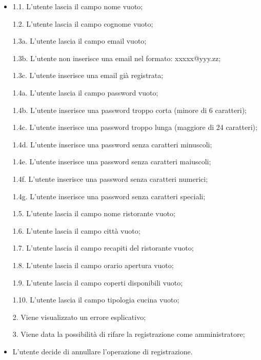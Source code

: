 \begin{itemize}
    \item 1.1.  L'utente lascia il campo nome vuoto;
    
    1.2.  L'utente lascia il campo cognome vuoto;
    
    1.3a.  L'utente lascia il campo email vuoto;
    
    1.3b.  L'utente non inserisce una email nel formato: xxxxx@yyy.zz;
    
    1.3c.  L'utente inserisce una email già registrata;
    
    1.4a.  L'utente lascia il campo password vuoto;
    
    1.4b.  L'utente inserisce una password troppo corta (minore di 6 caratteri);
    
    1.4c.  L'utente inserisce una password troppo lunga (maggiore di 24 caratteri);
    
    1.4d.  L'utente inserisce una password senza caratteri minuscoli;
    
    1.4e.  L'utente inserisce una password senza caratteri maiuscoli;
    
    1.4f.  L'utente inserisce una password senza caratteri numerici;
    
    1.4g.  L'utente inserisce una password senza caratteri speciali;

    1.5.  L'utente lascia il campo nome ristorante vuoto;

    1.6.  L'utente lascia il campo città vuoto;
    
    1.7.  L'utente lascia il campo recapiti del ristorante vuoto;
    
    1.8.  L'utente lascia il campo orario apertura vuoto;
    
    1.9.  L'utente lascia il campo coperti disponibili vuoto;
    
    1.10.  L'utente lascia il campo tipologia cucina vuoto;
    
    2.  Viene visualizzato un errore esplicativo;
    
    3.  Viene data la possibilità di rifare la registrazione come amministratore;
    \item L'utente decide di annullare l'operazione di registrazione.
\end{itemize}